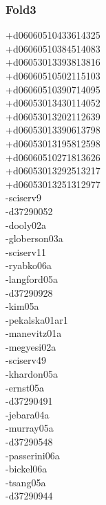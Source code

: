 \begin{multicols}{3}
\subsubsection*{Fold3}
+d06060510433614325\\
+d06060510384514083\\
+d06053013393813816\\
+d06060510502115103\\
+d06060510390714095\\
+d06053013430114052\\
+d06053013202112639\\
+d06053013390613798\\
+d06053013195812598\\
+d06060510271813626\\
+d06053013292513217\\
+d06053013251312977\\
-sciserv9\\
-d37290052\\
-dooly02a\\
-globerson03a\\
-sciserv11\\
-ryabko06a\\
-langford05a\\
-d37290928\\
-kim05a\\
-pekalska01ar1\\
-manevitz01a\\
-megyesi02a\\
-sciserv49\\
-khardon05a\\
-ernst05a\\
-d37290491\\
-jebara04a\\
-murray05a\\
-d37290548\\
-passerini06a\\
-bickel06a\\
-tsang05a\\
-d37290944\\

\end{multicols}
